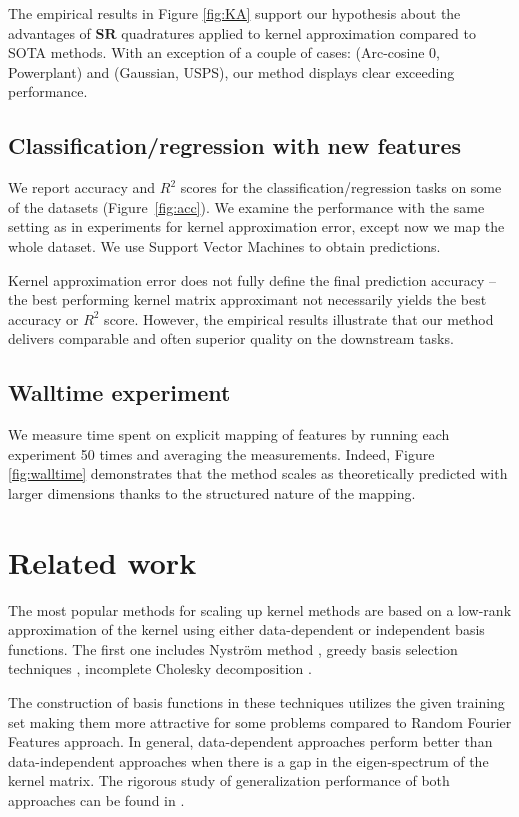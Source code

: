 The empirical results in Figure \ref{fig:KA} support our hypothesis about the advantages of $\mathbf{SR}$ quadratures applied to kernel approximation compared to SOTA methods. With an exception of a couple of cases: (Arc-cosine 0, Powerplant) and (Gaussian, USPS), our method displays clear exceeding performance.

\subsection{Classification/regression with new features}
\label{sub:finalscore}

We report accuracy and $R^2$ scores for the classification/regression tasks on some of the datasets (Figure~\ref{fig:acc}).
We examine the performance with the same setting as in experiments for kernel approximation error, except now we map the whole dataset. We use Support Vector Machines to obtain predictions.

Kernel approximation error does not fully define the final prediction accuracy -- the best performing kernel matrix approximant not necessarily yields the best accuracy or $R^2$ score. However, the empirical results illustrate that our method delivers comparable and often superior quality on the downstream tasks.

\subsection{Walltime experiment} We measure time spent on explicit mapping of features by running each experiment 50 times and averaging the measurements.  Indeed, Figure \ref{fig:walltime} demonstrates that the method scales as theoretically predicted with larger dimensions thanks to the structured nature of the mapping.

\section{Related work}
\label{sec:related_work}
The most popular methods for scaling up kernel methods are based on a low-rank approximation of the kernel using either data-dependent or independent basis functions. The first one includes Nystr{\" o}m method \citep{drineas2005nystrom}, greedy basis selection techniques \citep{smola2000sparse}, incomplete Cholesky decomposition \citep{fine2001efficient}.

The construction of basis functions in these techniques utilizes the given training set making them more attractive for some problems compared to Random Fourier Features approach. In general, data-dependent approaches perform better than data-independent approaches when there is a gap in the eigen-spectrum of the kernel matrix. The rigorous study of generalization performance of both approaches can be found in \citep{yang2012nystrom}.

